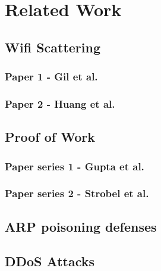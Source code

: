 \chapter{Related Work}


\section{Wifi Scattering}
\subsection{Paper 1 - Gil et al.}
\subsection{Paper 2 - Huang et al.}

\section{Proof of Work}
\subsection{Paper series 1 - Gupta et al.}
\subsection{Paper series 2 - Strobel et al.}

\section{ARP poisoning defenses}
\section{DDoS Attacks}